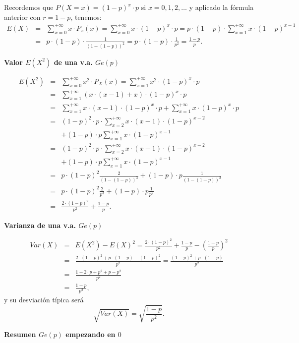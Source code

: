 \documentclass[
  letterpaper,
  DIV=11,
  numbers=noendperiod]{scrreprt}
\begin{document}
Recordemos que \(P(X=x)=(1-p)^x\cdot p\) si \(x=0,1,2,\ldots\) y
aplicado la fórmula anterior con \(r=1-p\), tenemos: \[
\begin{array}{rll}
E(X)&=&\sum_{x=0}^{+\infty} x\cdot P_x(x)=\sum_{x=0}^{+\infty} x\cdot (1-p)^x\cdot p=
p\cdot (1-p) \cdot \sum_{x=1}^{+\infty} x\cdot (1-p)^{x-1}\\
&=& p\cdot (1-p)\cdot \frac{1}{(1-(1-p))^2}=p\cdot (1-p)\cdot \frac{1}{p^2}=\frac{1-p}{p}.
\end{array}
\]

\textbf{Valor \(E(X^2)\) de una v.a. \(Ge(p)\)}

\[
\begin{array}{rll}
E(X^2)&=&\sum_{x=0}^{+\infty} x^2\cdot P_X(x)=\sum_{x=1}^{+\infty} x^2\cdot (1-p)^x\cdot p\\
&=& 
\sum_{x=1}^{+\infty} (x\cdot (x-1)+x)\cdot (1-p)^{x}\cdot p\\
&=&
\sum_{x=1}^{+\infty} x\cdot (x-1)\cdot (1-p)^{x}\cdot p+\sum_{x=1}^{+\infty} x \cdot (1-p)^{x}\cdot p\\
&=&
(1-p)^{2}\cdot p\cdot \sum_{x=2}^{+\infty} x\cdot (x-1)\cdot (1-p)^{x-2}\\ 
& & +    (1-p)\cdot p\sum_{x=1}^{+\infty} x \cdot (1-p)^{x-1} 
\\  &=&
(1-p)^{2}\cdot p\cdot \sum_{x=2}^{+\infty} x\cdot (x-1)\cdot (1-p)^{x-2}\\ 
& &+   (1-p)\cdot p\sum_{x=1}^{+\infty} x \cdot (1-p)^{x-1}\\
&=&
p\cdot (1-p)^2 \frac{2}{(1-(1-p))^3}+  (1-p)\cdot p \frac{1}{(1-(1-p))^2}\\
&=&
p\cdot (1-p)^2 \frac{2}{p^3}+  (1-p)\cdot p \frac{1}{p^2}\\
&=&\frac{2\cdot (1-p)^2}{p^2}+\frac{1-p}{p}.
\end{array}
\]

\textbf{Varianza de una v.a. \(Ge(p)\)}

\[
\begin{array}{rll}
Var(X)&=&E(X^2)-E(X)^2=\frac{2\cdot (1-p)^2}{p^2}+\frac{1-p}{p}-\left(\frac{1-p}{p}\right)^2\\
&=&
\frac{2\cdot (1-p)^2+p\cdot(1-p)-(1-p)^2}{p^2}=\frac{(1-p)^2+p\cdot(1-p)}{p^2}\\
&=&
\frac{1-2\cdot p + p^2+p-p^2}{p^2}\\
&=& \frac{1-p}{p^2},
\end{array}
\] y su desviación típica será \[\sqrt{Var(X)}=\sqrt{\frac{1-p}{p^2}}.\]

\textbf{Resumen \(Ge(p)\) empezando en \(0\)}
\end{document}
